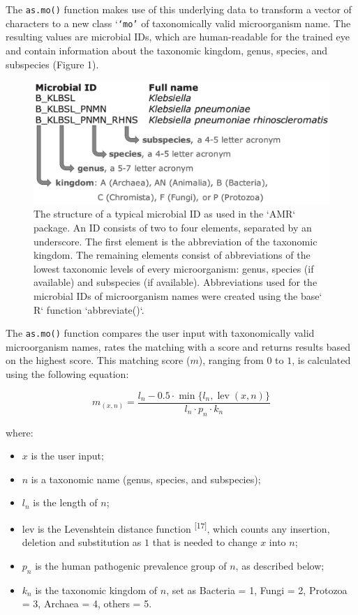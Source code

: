 \documentclass[
]{book}
\providecommand{\tightlist}{%
  \setlength{\itemsep}{0pt}\setlength{\parskip}{0pt}}
\begin{document}
The \texttt{as.mo()} function makes use of this underlying data to transform a vector of characters to a new class `\texttt{‘mo’} of taxonomically valid microorganism name. The resulting values are microbial IDs, which are human-readable for the trained eye and contain information about the taxonomic kingdom, genus, species, and subspecies (Figure 1).

\begin{figure}

{\centering \includegraphics[width=0.66\linewidth]{images/04-01} 

}

\caption{The structure of a typical microbial ID as used in the `AMR` package. An ID consists of two to four elements, separated by an underscore. The first element is the abbreviation of the taxonomic kingdom. The remaining elements consist of abbreviations of the lowest taxonomic levels of every microorganism: genus, species (if available) and subspecies (if available). Abbreviations used for the microbial IDs of microorganism names were created using the base` R` function `abbreviate()`.}\label{fig:fig4-1}
\end{figure}

The \texttt{as.mo()} function compares the user input with taxonomically valid microorganism names, rates the matching with a score and returns results based on the highest score. This matching score (\(m\)), ranging from \(0\) to \(1\), is calculated using the following equation:

\[m_{(x,n)} = \frac{l_{n} - 0.5 \cdot \min\{ l_n, \operatorname{lev}(x,n) \} }{l_{n} \cdot p_{n} \cdot k_{n}}\]

where:

\begin{itemize}
\tightlist
\item
  \(x\) is the user input;
\item
  \(n\) is a taxonomic name (genus, species, and subspecies);
\item
  \(l_n\) is the length of \(n\);
\item
  lev is the Levenshtein distance function \textsuperscript{{[}17{]}}, which counts any insertion, deletion and substitution as \(1\) that is needed to change \(x\) into \(n\);
\item
  \(p_n\) is the human pathogenic prevalence group of \(n\), as described below;
\item
  \(k_n\) is the taxonomic kingdom of \(n\), set as Bacteria = 1, Fungi = 2, Protozoa = 3, Archaea = 4, others = 5.
\end{itemize}
\end{document}
